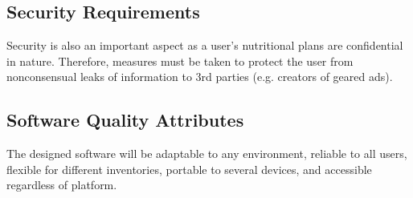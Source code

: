 \subsection{Security Requirements}
Security is also an important aspect as a user’s nutritional plans are confidential in nature. Therefore, measures must be taken to protect the user from nonconsensual leaks of information to 3rd parties (e.g. creators of geared ads). 

\subsection{Software Quality Attributes}
The designed software will be adaptable to any environment, reliable to all users, flexible for different inventories, portable to several devices, and accessible regardless of platform. 


\pagebreak


